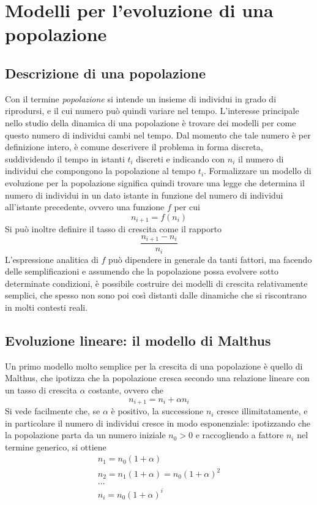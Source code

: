 \section{Modelli per l'evoluzione di una popolazione}
\subsection{Descrizione di una popolazione}
Con il termine \textit{popolazione} si intende un insieme di individui in grado di riprodursi, e il cui numero può quindi variare nel tempo. L'interesse principale nello studio della dinamica di una popolazione è trovare dei modelli per come questo numero di individui cambi nel tempo. Dal momento che tale numero è per definizione intero, è comune descrivere il problema in forma discreta, suddividendo il tempo in istanti $t_i$ discreti e indicando con $n_i$ il numero di individui che compongono la popolazione al tempo $t_i$. Formalizzare un modello di evoluzione per la popolazione significa quindi trovare una legge che determina il numero di individui in un dato istante in funzione del numero di individui all'istante precedente, ovvero una funzione $f$ per cui
$$n_{i+1} = f(n_i)$$
Si può inoltre definire il tasso di crescita come il rapporto $$\dfrac{n_{i+1} - n_i}{n_i}$$
L'espressione analitica di $f$ può dipendere in generale da tanti fattori, ma facendo delle semplificazioni e assumendo che la popolazione possa evolvere sotto determinate condizioni, è possibile costruire dei modelli di crescita relativamente semplici, che spesso non sono poi così distanti dalle dinamiche che si riscontrano in molti contesti reali.

\subsection{Evoluzione lineare: il modello di Malthus}
Un primo modello molto semplice per la crescita di una popolazione è quello di Malthus, che ipotizza che la popolazione cresca secondo una relazione lineare con un tasso di crescita $\alpha$ costante, ovvero che
\begin{equation}
    n_{i+1} = n_i + \alpha n_i
    \label{eq:malthus}
\end{equation}
Si vede facilmente che, se $\alpha$ è positivo, la successione {$n_i$} cresce illimitatamente, e in particolare il numero di individui cresce in modo esponenziale: ipotizzando che la popolazione parta da un numero iniziale $n_0 > 0$ e raccogliendo a fattore $n_i$ nel termine generico, si ottiene 
\begin{equation*}
    \begin{gathered}
    n_1 = n_0(1+\alpha) \\ n_2 = n_1(1+\alpha) = n_0(1+\alpha)^2\\\dots \\ n_i = n_0(1+\alpha)^i
    \end{gathered}
\end{equation*}

